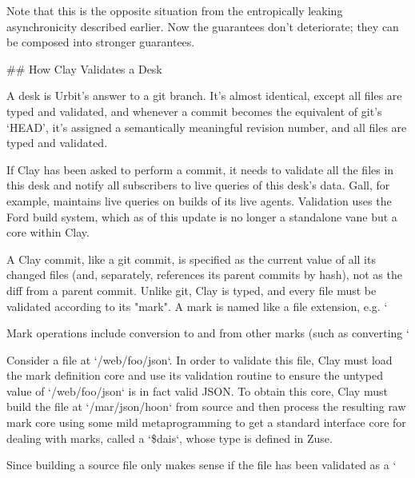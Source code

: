 \documentclass[twoside]{article}
\begin{document}
Note that this is the opposite situation from the entropically leaking asynchronicity described earlier. Now the guarantees don’t deteriorate; they can be composed into stronger guarantees.

## How Clay Validates a Desk

A desk is Urbit's answer to a git branch. It's almost identical, except all files are typed and validated, and whenever a commit becomes the equivalent of git’s ‘HEAD’, it’s assigned a semantically meaningful revision number, and all files are typed and validated.

If Clay has been asked to perform a commit, it needs to validate all the files in this desk and notify all subscribers to live queries of this desk's data. Gall, for example, maintains live queries on builds of its live agents. Validation uses the Ford build system, which as of this update is no longer a standalone vane but a core within Clay.

A Clay commit, like a git commit, is specified as the current value of all its changed files (and, separately, references its parent commits by hash), not as the diff from a parent commit. Unlike git, Clay is typed, and every file must be validated according to its "mark". A mark is named like a file extension, e.g. `%

Mark operations include conversion to and from other marks (such as converting `%

Consider a file at `/web/foo/json`. In order to validate this file, Clay must load the mark definition core and use its validation routine to ensure the untyped value of `/web/foo/json` is in fact valid JSON. To obtain this core, Clay must build the file at `/mar/json/hoon` from source and then process the resulting raw mark core using some mild metaprogramming to get a standard interface core for dealing with marks, called a `\$dais`, whose type is defined in Zuse.

Since building a source file only makes sense if the file has been validated as a `%
\end{document}
